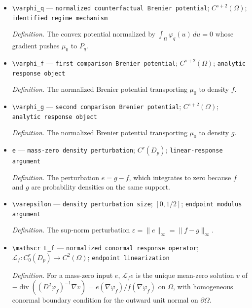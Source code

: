 \documentclass{article}
\begin{document}
\begin{itemize}
  \par\smallskip\noindent\emph{Definition.} Convex potential normalized by \(\int_{\Omega}\varphi_p(u)\,du=0\) whose gradient pushes \(\mu_0\) to \(P_p\).
  \item \texttt{\textbackslash{}\allowbreak{}varphi\_\allowbreak{}q} --- \texttt{normalized counterfactual Brenier potential}; \(C^{s+2}(\Omega)\); \texttt{identified regime mechanism}
  \par\smallskip\noindent\emph{Definition.} The convex potential normalized by \(\int_{\Omega}\varphi_q(u)\,du=0\) whose gradient pushes \(\mu_0\) to \(P_q\).
  \item \texttt{\textbackslash{}\allowbreak{}varphi\_\allowbreak{}f} --- \texttt{first comparison Brenier potential}; \(C^{s+2}(\Omega)\); \texttt{analytic response object}
  \par\smallskip\noindent\emph{Definition.} The normalized Brenier potential transporting \(\mu_0\) to density \(f\).
  \item \texttt{\textbackslash{}\allowbreak{}varphi\_\allowbreak{}g} --- \texttt{second comparison Brenier potential}; \(C^{s+2}(\Omega)\); \texttt{analytic response object}
  \par\smallskip\noindent\emph{Definition.} The normalized Brenier potential transporting \(\mu_0\) to density \(g\).
  \item \texttt{e} --- \texttt{mass-\allowbreak{}zero density perturbation}; \(C^r(D_p)\); \texttt{linear-\allowbreak{}response argument}
  \par\smallskip\noindent\emph{Definition.} The perturbation \(e=g-f\), which integrates to zero because \(f\) and \(g\) are probability densities on the same support.
  \item \texttt{\textbackslash{}\allowbreak{}varepsilon} --- \texttt{density perturbation size}; \([0,1/2]\); \texttt{endpoint modulus argument}
  \par\smallskip\noindent\emph{Definition.} The sup-norm perturbation \(\varepsilon=\lVert e\rVert_\infty=\lVert f-g\rVert_\infty\).
  \item \texttt{\textbackslash{}\allowbreak{}mathscr L\_\allowbreak{}f} --- \texttt{normalized conormal response operator}; \(\mathscr L_f:C^r_0(D_p)\to C^2(\Omega)\); \texttt{endpoint linearization}
  \par\smallskip\noindent\emph{Definition.} For a mass-zero input \(e\), \(\mathscr L_f e\) is the unique mean-zero solution \(v\) of \(-\operatorname{div}((D^2\varphi_f)^{-1}\nabla v)=e(\nabla\varphi_f)/f(\nabla\varphi_f)\) on \(\Omega\), with homogeneous conormal boundary condition for the outward unit normal on \(\partial\Omega\).

\end{itemize}
\end{document}
